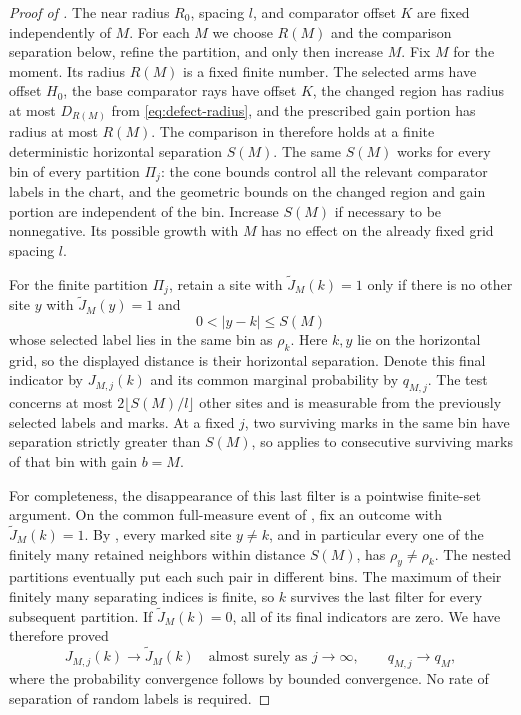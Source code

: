 \begin{proof}[Proof of ]
The near radius $R_0$, spacing $l$, and comparator offset $K$ are fixed
independently of $M$. For each $M$ we choose $R(M)$ and the comparison
separation below, refine the partition, and only then increase $M$.
Fix $M$ for the moment. Its radius $R(M)$ is a fixed finite number.
The selected arms have offset $H_0$, the base comparator rays have
offset $K$, the changed region has radius at most $D_{R(M)}$ from
\eqref{eq:defect-radius}, and the prescribed gain portion has radius at
most $R(M)$.  The comparison in  therefore
holds at a finite deterministic horizontal separation $S(M)$.  The same
$S(M)$ works for every bin of every partition $\Pi_j$: the cone bounds
control all the relevant comparator labels in the chart, and the
geometric bounds on the changed region and gain portion are independent
of the bin.  Increase $S(M)$ if necessary to be nonnegative.  Its possible
growth with $M$ has no effect on the already fixed grid spacing $l$.

For the finite partition $\Pi_j$, retain a site with
$\widetilde J_M(k)=1$ only if there is no other site $y$ with
$\widetilde J_M(y)=1$ and
\[
 0<|y-k|\leq S(M)
\]
whose selected label lies in the same bin as $\rho_k$.  Here $k,y$ lie
on the horizontal grid, so the displayed distance is their horizontal
separation.  Denote this final indicator by $J_{M,j}(k)$ and its common
marginal probability by $q_{M,j}$.  The test concerns at most
$2\lfloor S(M)/l\rfloor$ other sites and is measurable from the
previously selected labels and marks.  At a fixed $j$, two surviving
marks in the same bin have separation strictly greater than $S(M)$,
so  applies to consecutive surviving marks
of that bin with gain $b=M$.

For completeness, the disappearance of this last filter is a
pointwise finite-set argument.  On the common full-measure event of
, fix an outcome with $\widetilde J_M(k)=1$.  By
, every marked site $y\ne k$, and in
particular every one of the finitely many retained neighbors within
distance $S(M)$, has $\rho_y\ne\rho_k$.  The nested partitions
eventually put each such pair in different bins.  The maximum of their
finitely many separating indices is finite, so $k$ survives the last
filter for every subsequent partition.  If $\widetilde J_M(k)=0$, all
of its final indicators are zero.  We have therefore proved
\begin{equation}\label{eq:fixed-M-filter-limit}
 J_{M,j}(k)\longrightarrow\widetilde J_M(k)
 \quad\text{almost surely as }j\longrightarrow\infty,
 \qquad q_{M,j}\longrightarrow q_M,
\end{equation}
where the probability convergence follows by bounded convergence.
No rate of separation of random labels is required.


\end{proof}
